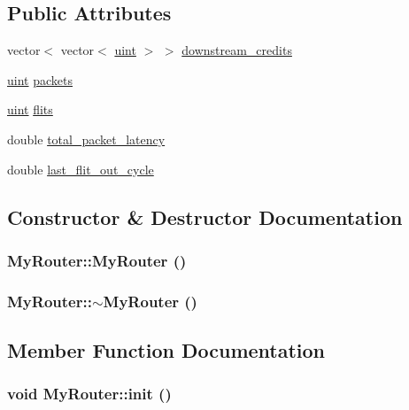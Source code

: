 \subsection*{Public Attributes}
\begin{CompactItemize}
\item 
vector$<$ vector$<$ \hyperlink{outputBuffer_8h_91ad9478d81a7aaf2593e8d9c3d06a14}{uint} $>$ $>$ \hyperlink{classMyRouter_f15a834dbd27a5070e1b0388c2a40d4c}{downstream\_\-credits}
\item 
\hyperlink{outputBuffer_8h_91ad9478d81a7aaf2593e8d9c3d06a14}{uint} \hyperlink{classMyRouter_32ec6983b42b6efc05af4de71055eac4}{packets}
\item 
\hyperlink{outputBuffer_8h_91ad9478d81a7aaf2593e8d9c3d06a14}{uint} \hyperlink{classMyRouter_a6cc2fffa1841027970fcdb3c948781e}{flits}
\item 
double \hyperlink{classMyRouter_081915dc1164141104ffa6ce7dd05ac5}{total\_\-packet\_\-latency}
\item 
double \hyperlink{classMyRouter_1b75d62cb9e51e8814704582d787b3ec}{last\_\-flit\_\-out\_\-cycle}
\end{CompactItemize}


\subsection{Constructor \& Destructor Documentation}
\hypertarget{classMyRouter_22ab97be4fbffe1aa4e33bd5cd470167}{
\subsubsection[{MyRouter}]{\setlength{\rightskip}{0pt plus 5cm}MyRouter::MyRouter ()}}
\label{classMyRouter_22ab97be4fbffe1aa4e33bd5cd470167}


\hypertarget{classMyRouter_3ffe36f3427a8beeb62007909ece9dc8}{
\subsubsection[{$\sim$MyRouter}]{\setlength{\rightskip}{0pt plus 5cm}MyRouter::$\sim$MyRouter ()}}
\label{classMyRouter_3ffe36f3427a8beeb62007909ece9dc8}




\subsection{Member Function Documentation}
\hypertarget{classMyRouter_8c9be5d944c7cb4c98f3b833e614274c}{
\subsubsection[{init}]{\setlength{\rightskip}{0pt plus 5cm}void MyRouter::init ()}}
\label{classMyRouter_8c9be5d944c7cb4c98f3b833e614274c}


